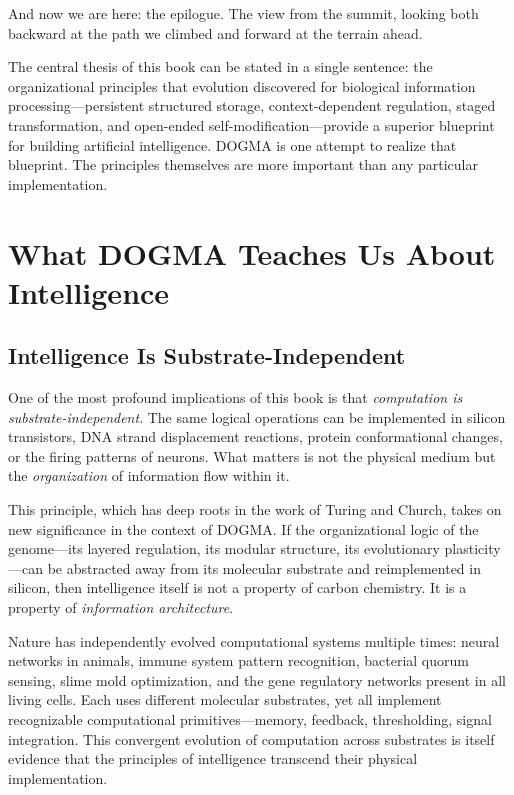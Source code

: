 And now we are here: the epilogue. The view from the summit, looking both backward at the path we climbed and forward at the terrain ahead.

\begin{keyinsight}
The central thesis of this book can be stated in a single sentence: the organizational principles that evolution discovered for biological information processing---persistent structured storage, context-dependent regulation, staged transformation, and open-ended self-modification---provide a superior blueprint for building artificial intelligence. DOGMA is one attempt to realize that blueprint. The principles themselves are more important than any particular implementation.
\end{keyinsight}

\section{What DOGMA Teaches Us About Intelligence}
\label{sec:lessons-about-intelligence}

\subsection{Intelligence Is Substrate-Independent}

One of the most profound implications of this book is that \emph{computation is substrate-independent}. The same logical operations can be implemented in silicon transistors, DNA strand displacement reactions, protein conformational changes, or the firing patterns of neurons. What matters is not the physical medium but the \emph{organization} of information flow within it.

This principle, which has deep roots in the work of Turing and Church, takes on new significance in the context of DOGMA. If the organizational logic of the genome---its layered regulation, its modular structure, its evolutionary plasticity---can be abstracted away from its molecular substrate and reimplemented in silicon, then intelligence itself is not a property of carbon chemistry. It is a property of \emph{information architecture}.

\begin{bioinsight}
Nature has independently evolved computational systems multiple times: neural networks in animals, immune system pattern recognition, bacterial quorum sensing, slime mold optimization, and the gene regulatory networks present in all living cells. Each uses different molecular substrates, yet all implement recognizable computational primitives---memory, feedback, thresholding, signal integration. This convergent evolution of computation across substrates is itself evidence that the principles of intelligence transcend their physical implementation.
\end{bioinsight}

